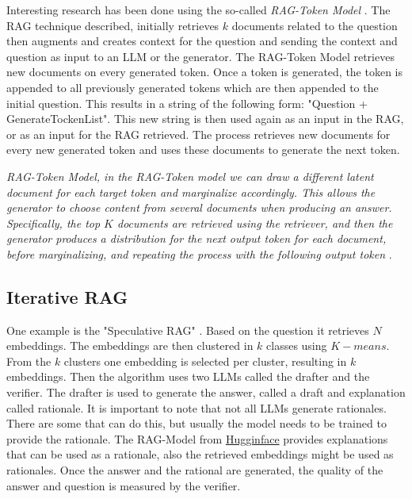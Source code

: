 \documentclass{wseas}
\begin{document}
Interesting research has been done using the so-called \emph{RAG-Token
Model} \cite{Retrieval_Augmented_Generation_(RAG)_Explained_Understanding_Key_Concepts}. The RAG technique described, initially retrieves \(k\) documents
related to the question then augments and creates context for the question and
sending the context and question as input to an LLM or the
generator. The RAG-Token Model retrieves new documents on every
generated token. Once a token is generated, the token is appended to all
previously generated tokens which are then appended to the initial question. 
This results in a string of the following form: "Question +
GenerateTockenList". This new string is then used again as an input in
the RAG, or as an input for the RAG retrieved. The process retrieves new
documents for every new generated token and uses these documents to
generate the next token. 

\emph{RAG-Token Model, in the RAG-Token model we can draw a different
latent document for each target token and marginalize accordingly. This
allows the generator to choose content from several documents when
producing an answer. Specifically, the top $K$ documents are retrieved using
the retriever, and then the generator produces a distribution for the
next output token for each document, before marginalizing, and repeating
the process with the following output token} \cite{Retrieval_Augmented_Generation_(RAG)_Explained_Understanding_Key_Concepts}.

\subsection{Iterative RAG}

One example is the "Speculative RAG" \cite{SpeculativeRAG_EnhancingRetrieval-AugmentedGenerationThroughDrafting}. 
Based on the question it retrieves \(N\) embeddings.
The embeddings are then clustered in \(k\) classes using $K-means$. From the
\(k\) clusters one embedding is selected per cluster, resulting in $k$
embeddings. Then the algorithm uses two LLMs called the drafter and the
verifier. The drafter is used to generate the answer, called a draft and
explanation called rationale. It is important to note that not all LLMs
generate rationales. There are some that can do this, but usually the
model needs to be trained to provide the rationale. The RAG-Model from
\href{https://huggingface.co/}{Hugginface} provides explanations that 
can be used as a rationale, also the retrieved embeddings might be used 
as rationales. Once the answer and the rational are generated, the quality 
of the answer and question is measured by the verifier.
\end{document}
